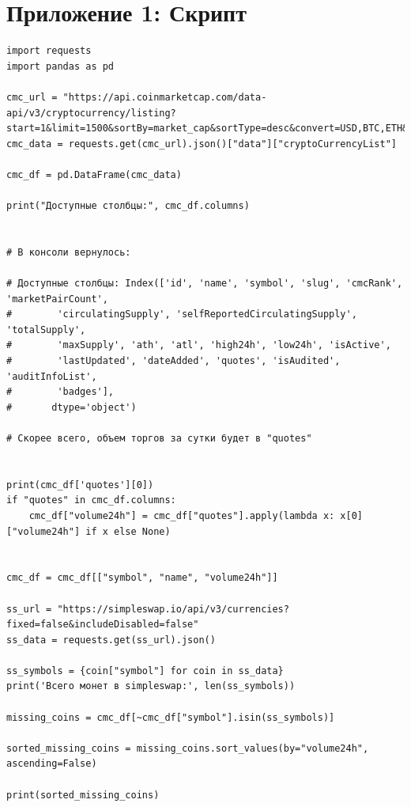 \documentclass[12pt]{article}
\theoremstyle{indented}
\theoremstyle{definition}
\theoremstyle{remark}
\begin{document}
\section*{Приложение 1: Скрипт}
\begin{verbatim}
import requests
import pandas as pd

cmc_url = "https://api.coinmarketcap.com/data-api/v3/cryptocurrency/listing?start=1&limit=1500&sortBy=market_cap&sortType=desc&convert=USD,BTC,ETH&cryptoType=all&tagType=all&audited=false&aux=ath,atl,high24h,low24h,num_market_pairs,cmc_rank,date_added,max_supply,circulating_supply,total_supply,volume_7d,volume_30d,self_reported_circulating_supply,self_reported_market_cap"
cmc_data = requests.get(cmc_url).json()["data"]["cryptoCurrencyList"]

cmc_df = pd.DataFrame(cmc_data)

print("Доступные столбцы:", cmc_df.columns)


# В консоли вернулось:

# Доступные столбцы: Index(['id', 'name', 'symbol', 'slug', 'cmcRank', 'marketPairCount',
#        'circulatingSupply', 'selfReportedCirculatingSupply', 'totalSupply',
#        'maxSupply', 'ath', 'atl', 'high24h', 'low24h', 'isActive',
#        'lastUpdated', 'dateAdded', 'quotes', 'isAudited', 'auditInfoList',
#        'badges'],
#       dtype='object')

# Скорее всего, объем торгов за сутки будет в "quotes" 


print(cmc_df['quotes'][0])
if "quotes" in cmc_df.columns:
    cmc_df["volume24h"] = cmc_df["quotes"].apply(lambda x: x[0]["volume24h"] if x else None)


cmc_df = cmc_df[["symbol", "name", "volume24h"]]

ss_url = "https://simpleswap.io/api/v3/currencies?fixed=false&includeDisabled=false"
ss_data = requests.get(ss_url).json()

ss_symbols = {coin["symbol"] for coin in ss_data}
print('Всего монет в simpleswap:', len(ss_symbols))

missing_coins = cmc_df[~cmc_df["symbol"].isin(ss_symbols)]

sorted_missing_coins = missing_coins.sort_values(by="volume24h", ascending=False)

print(sorted_missing_coins)
\end{verbatim}
\end{document}

